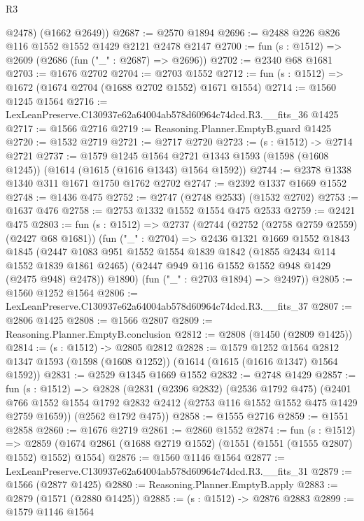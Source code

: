 \begin{lexlean}{R3}
\begin{coremodule}
        @2478)
      (@1662 @2649))
@2687 := @2570 @1894
@2696 := @2488 @226 @826 @116 @1552 @1552 @1429 @2121 @2478 @2147
@2700 := fun (s : @1512) => @2609 (@2686 (fun ("_" : @2687) => @2696))
@2702 := @2340 @68 @1681
@2703 := @1676 @2702
@2704 := @2703 @1552
@2712 := fun (s : @1512) => @1672 (@1674 @2704 (@1688 @2702 @1552) @1671 @1554)
@2714 := @1560 @1245 @1564
@2716 := LexLeanPreserve.C130937e62a64004ab578d60964c74dcd.R3.__fits_36 @1425
@2717 := @1566 @2716
@2719 := Reasoning.Planner.EmptyB.guard @1425
@2720 := @1532 @2719
@2721 := @2717 @2720
@2723 := (s : @1512) -> @2714 @2721
@2737 := @1579
    @1245
    @1564
    @2721
    @1343
    @1593
    (@1598 (@1608 @1245))
    (@1614 (@1615 (@1616 @1343) @1564 @1592))
@2744 := @2378 @1338 @1340 @311 @1671 @1750 @1762 @2702
@2747 := @2392 @1337 @1669 @1552
@2748 := @1436 @475
@2752 := @2747 (@2748 @2533) (@1532 @2702)
@2753 := @1637 @476
@2758 := @2753 @1332 @1552 @1554 @475 @2533
@2759 := @2421 @475
@2803 := fun (s : @1512) =>
  @2737
    (@2744
      (@2752 (@2758 @2759 @2559) (@2427 @68 @1681))
      (fun ("_" : @2704) =>
      @2436
        @1321
        @1669
        @1552
        @1843
        @1845
        (@2447
          @1083
          @951
          @1552
          @1554
          @1839
          @1842
          (@1855 @2434 @114 @1552 @1839 @1861 @2465)
          (@2447 @949 @116 @1552 @1552 @948 @1429 (@2475 @948) @2478))
        @1890)
      (fun ("_" : @2703 @1894) => @2497))
@2805 := @1560 @1252 @1564
@2806 := LexLeanPreserve.C130937e62a64004ab578d60964c74dcd.R3.__fits_37
@2807 := @2806 @1425
@2808 := @1566 @2807
@2809 := Reasoning.Planner.EmptyB.conclusion
@2812 := @2808 (@1450 (@2809 @1425))
@2814 := (s : @1512) -> @2805 @2812
@2828 := @1579
    @1252
    @1564
    @2812
    @1347
    @1593
    (@1598 (@1608 @1252))
    (@1614 (@1615 (@1616 @1347) @1564 @1592))
@2831 := @2529 @1345 @1669 @1552
@2832 := @2748 @1429
@2857 := fun (s : @1512) =>
  @2828
    (@2831
      (@2396 @2832)
      (@2536 @1792 @475)
      (@2401 @766 @1552 @1554 @1792 @2832 @2412 (@2753 @116 @1552 @1552 @475 @1429 @2759 @1659))
      (@2562 @1792 @475))
@2858 := @1555 @2716
@2859 := @1551 @2858
@2860 := @1676 @2719
@2861 := @2860 @1552
@2874 := fun (s : @1512) =>
  @2859 (@1674 @2861 (@1688 @2719 @1552) (@1551 (@1551 (@1555 @2807) @1552) @1552) @1554)
@2876 := @1560 @1146 @1564
@2877 := LexLeanPreserve.C130937e62a64004ab578d60964c74dcd.R3.__fits_31
@2879 := @1566 (@2877 @1425)
@2880 := Reasoning.Planner.EmptyB.apply
@2883 := @2879 (@1571 (@2880 @1425))
@2885 := (s : @1512) -> @2876 @2883
@2899 := @1579
    @1146
    @1564

\end{coremodule}
\end{lexlean}
